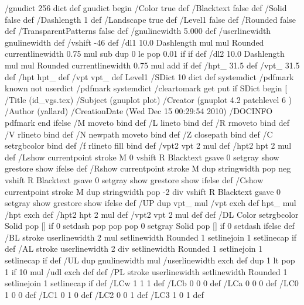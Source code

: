 \endgroup
/gnudict 256 dict def
gnudict begin
%
%
/Color true def
/Blacktext false def
/Solid false def
/Dashlength 1 def
/Landscape true def
/Level1 false def
/Rounded false def
/TransparentPatterns false def
/gnulinewidth 5.000 def
/userlinewidth gnulinewidth def
%
/vshift -46 def
/dl1 {
  10.0 Dashlength mul mul
  Rounded { currentlinewidth 0.75 mul sub dup 0 le { pop 0.01 } if } if
} def
/dl2 {
  10.0 Dashlength mul mul
  Rounded { currentlinewidth 0.75 mul add } if
} def
/hpt_ 31.5 def
/vpt_ 31.5 def
/hpt hpt_ def
/vpt vpt_ def
Level1 {} {
/SDict 10 dict def
systemdict /pdfmark known not {
  userdict /pdfmark systemdict /cleartomark get put
} if
SDict begin [
  /Title (id_vgs.tex)
  /Subject (gnuplot plot)
  /Creator (gnuplot 4.2 patchlevel 6 )
  /Author (yallard)
  /CreationDate (Wed Dec 15 00:29:54 2010)
  /DOCINFO pdfmark
end
} ifelse
%
%
/M {moveto} bind def
/L {lineto} bind def
/R {rmoveto} bind def
/V {rlineto} bind def
/N {newpath moveto} bind def
/Z {closepath} bind def
/C {setrgbcolor} bind def
/f {rlineto fill} bind def
/vpt2 vpt 2 mul def
/hpt2 hpt 2 mul def
/Lshow {currentpoint stroke M 0 vshift R 
	Blacktext {gsave 0 setgray show grestore} {show} ifelse} def
/Rshow {currentpoint stroke M dup stringwidth pop neg vshift R
	Blacktext {gsave 0 setgray show grestore} {show} ifelse} def
/Cshow {currentpoint stroke M dup stringwidth pop -2 div vshift R 
	Blacktext {gsave 0 setgray show grestore} {show} ifelse} def
/UP {dup vpt_ mul /vpt exch def hpt_ mul /hpt exch def
  /hpt2 hpt 2 mul def /vpt2 vpt 2 mul def} def
/DL {Color {setrgbcolor Solid {pop []} if 0 setdash}
 {pop pop pop 0 setgray Solid {pop []} if 0 setdash} ifelse} def
/BL {stroke userlinewidth 2 mul setlinewidth
	Rounded {1 setlinejoin 1 setlinecap} if} def
/AL {stroke userlinewidth 2 div setlinewidth
	Rounded {1 setlinejoin 1 setlinecap} if} def
/UL {dup gnulinewidth mul /userlinewidth exch def
	dup 1 lt {pop 1} if 10 mul /udl exch def} def
/PL {stroke userlinewidth setlinewidth
	Rounded {1 setlinejoin 1 setlinecap} if} def
/LCw {1 1 1} def
/LCb {0 0 0} def
/LCa {0 0 0} def
/LC0 {1 0 0} def
/LC1 {0 1 0} def
/LC2 {0 0 1} def
/LC3 {1 0 1} def
